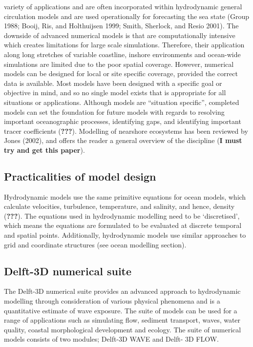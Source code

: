 \documentclass[
]{article}
\begin{document}
variety of applications and are often incorporated within hydrodynamic
general circulation models and are used operationally for forecasting
the sea state (Group 1988; Booij, Ris, and Holthuijsen 1999; Smith,
Sherlock, and Resio 2001). The downside of advanced numerical models is
that are computationally intensive which creates limitations for large
scale simulations. Therefore, their application along long stretches of
variable coastline, inshore environments and ocean-wide simulations are
limited due to the poor spatial coverage. However, numerical models can
be designed for local or site specific coverage, provided the correct
data is available. Most models have been designed with a specific goal
or objective in mind, and so no single model exists that is appropriate
for all situations or applications. Although models are ``situation
specific'', completed models can set the foundation for future models
with regards to resolving important oceanographic processes, identifying
gaps, and identifying important tracer coefficients ({\textbf{???}}).
Modelling of nearshore ecosystems has been reviewed by Jones (2002), and
offers the reader a general overview of the discipline (\textbf{I must
try and get this paper}).

\hypertarget{practicalities-of-model-design}{%
\subsection{Practicalities of model
design}\label{practicalities-of-model-design}}

Hydrodynamic models use the same primitive equations for ocean models,
which calculate velocities, turbulence, temperature, and salinity, and
hence, density ({\textbf{???}}). The equations used in hydrodynamic
modelling need to be `discretised', which means the equations are
formulated to be evaluated at discrete temporal and spatial points.
Additionally, hydrodynamic models use similar approaches to grid and
coordinate structures (see ocean modelling section).

\hypertarget{delft-3d-numerical-suite}{%
\subsection{Delft-3D numerical suite}\label{delft-3d-numerical-suite}}

The Delft-3D numerical suite provides an advanced approach to
hydrodynamic modelling through consideration of various physical
phenomena and is a quantitative estimate of wave exposure. The suite of
models can be used for a range of applications such as simulating flow,
sediment transport, waves, water quality, coastal morphological
development and ecology. The suite of numerical models consists of two
modules; Delft-3D WAVE and Delft- 3D FLOW.
\end{document}
